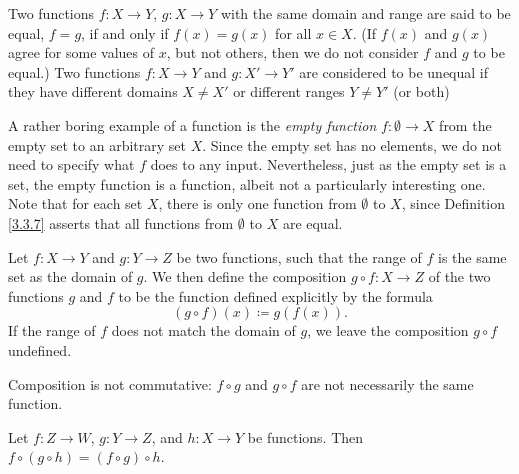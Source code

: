 \begin{definition}\label{3.3.7}
Two functions \(f : X \to Y\), \(g : X \to Y\) with the same domain and range are said to be equal, \(f = g\), if and only if \(f(x) = g(x)\) for all \(x \in X\).
(If \(f(x)\) and \(g(x)\) agree for some values of \(x\), but not others, then we do not consider \(f\) and \(g\) to be equal.)
Two functions \(f: X \to Y\) and \(g: X' \to Y'\) are considered to be unequal if they have different domains \(X \neq X'\) or different ranges \(Y \neq Y'\) (or both)
\end{definition}

\begin{note}
A rather boring example of a function is the \emph{empty function} \(f : \emptyset \to X\) from the empty set to an arbitrary set \(X\).
Since the empty set has no elements, we do not need to specify what \(f\) does to any input.
Nevertheless, just as the empty set is a set, the empty function is a function, albeit not a particularly interesting one.
Note that for each set \(X\), there is only one function from \(\emptyset\) to \(X\), since Definition \ref{3.3.7} asserts that all functions from \(\emptyset\) to \(X\) are equal.
\end{note}

\setcounter{theorem}{9}
\begin{definition}[Composition]\label{3.3.10}
Let \(f : X \to Y\) and \(g : Y \to Z\) be two functions, such that the range of \(f\) is the same set as the domain of \(g\).
We then define the composition \(g \circ f : X \to Z\) of the two functions \(g\) and \(f\) to be the function defined explicitly by the formula
\[
    (g \circ f)(x) \coloneqq g(f(x)).
\]
If the range of \(f\) does not match the domain of \(g\), we leave the composition \(g \circ f\) undefined.
\end{definition}

\begin{note}
Composition is not commutative: \(f \circ g\) and \(g \circ f\) are not necessarily the same function.
\end{note}

\setcounter{theorem}{11}
\begin{lemma}\label{3.3.12}
Let \(f : Z \to W\), \(g : Y \to Z\), and \(h : X \to Y\) be functions.
Then \(f \circ (g \circ h) = (f \circ g) \circ h\).
\end{lemma}

